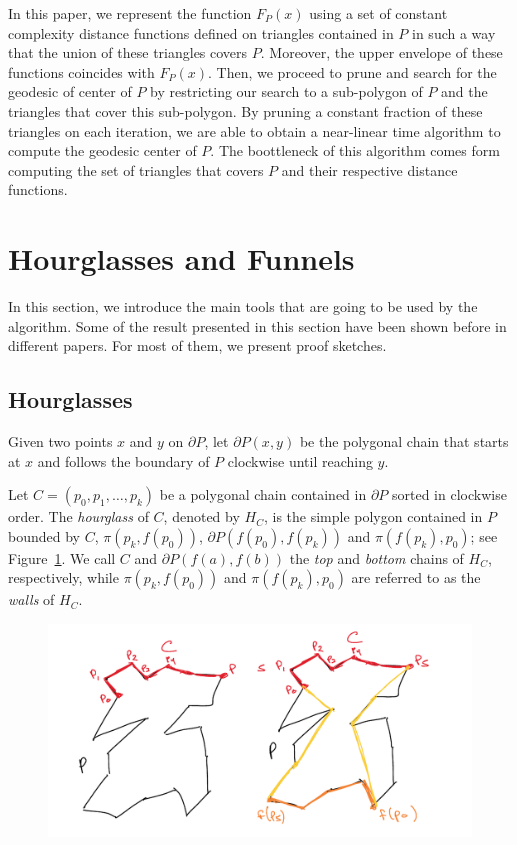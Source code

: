 \documentclass[a4paper,UKenglish]{lipics}
\newcommand{\F}[2]{\ensuremath{F_{\scriptscriptstyle #1}(#2)}}
\newcommand{\ff}[1]{\ensuremath{f(#1)}}
\newcommand{\p}[2]{\ensuremath{\pi(#1, #2)}}
\begin{document}
In this paper, we represent the function $\F{P}{x}$ using a set of constant complexity distance functions defined on triangles contained in $P$ in such a way that the union of these triangles covers $P$. Moreover, the upper envelope of these functions coincides with $\F{P}{x}$.
Then, we proceed to prune and search for the geodesic of center of $P$ by restricting our search to a sub-polygon of $P$ and the triangles that cover this sub-polygon. By pruning a constant fraction of these triangles on each iteration, we are able to obtain a near-linear time algorithm to compute the geodesic center of $P$. The boottleneck of this algorithm comes form computing the set of triangles that covers $P$ and their respective distance functions.


\section{Hourglasses and Funnels}
In this section, we introduce the main tools that are going to be used by the algorithm. Some of the result presented in this section have been shown before in different papers. For most of them, we present proof sketches.

\subsection{Hourglasses}

Given two points $x$ and $y$ on $\partial P$, let $\partial P(x,y)$ be the polygonal chain that starts at $x$ and follows the boundary of $P$ clockwise until reaching $y$.

Let $C = (p_0, p_1, \ldots, p_k)$ be a polygonal chain contained in $\partial P$ sorted in clockwise order.
The \emph{hourglass} of $C$, denoted by $H_C$, is the simple polygon contained in $P$ bounded by $C$, $\p{p_k}{\ff{p_0}}$, $\partial P(\ff{p_0}, \ff{p_k})$ and $\p{\ff{p_k}}{ p_0}$; see Figure~\ref{fig:Transition chains and hourglasses}. 
We call $C$ and $\partial P(\ff{a}, \ff{b})$ the \emph{top} and \emph{bottom} chains of $H_C$, respectively, while $\p{p_k}{ \ff{p_0}}$ and $\p{\ff{p_k}}{p_0}$ are referred to as the \emph{walls} of $H_C$.

\begin{figure}[tb]
\centering
\includegraphics[width=1\textwidth]{img/TransitionChains.pdf}
\caption{\small }
\label{fig:Transition chains and hourglasses}
\end{figure}
\end{document}
